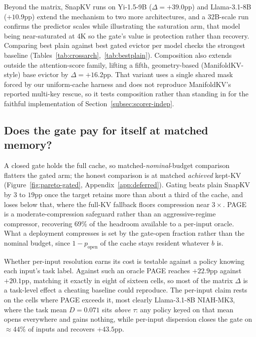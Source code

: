 \documentclass{article}
\newcommand{\method}{PAGE\xspace}
\begin{document}
Beyond the matrix, SnapKV runs on Yi-1.5-9B ($\Delta = +39.0$pp) and
Llama-3.1-8B ($+10.9$pp) extend the mechanism to two more architectures, and a
32B-scale run confirms the predictor scales while illustrating the saturation
arm, that model being near-saturated at 4K so the gate's value is protection
rather than recovery. Comparing best plain against best gated evictor per
model checks the strongest baseline
(Tables~\ref{tab:crossarch},~\ref{tab:bestplain}). Composition also extends
outside the attention-score family, lifting a fifth, geometry-based
(ManifoldKV-style) base evictor by $\Delta = +16.2$pp. That variant uses a
single shared mask forced by our uniform-cache harness and does not reproduce
ManifoldKV's reported multi-key rescue, so it tests composition rather than
standing in for the faithful implementation of
Section~\ref{subsec:scorer-indep}.

\subsection{Does the gate pay for itself at matched memory?}
\label{subsec:pareto}

A closed gate holds the full cache, so matched-\emph{nominal}-budget
comparison flatters the gated arm; the honest comparison is at matched
\emph{achieved} kept-KV (Figure~\ref{fig:pareto-gated},
Appendix~\ref{app:deferred}). Gating beats plain SnapKV by $3$ to $19$pp once
the target retains more than about a third of the cache, and loses below that,
where the full-KV fallback floors compression near $3\times$. \method is a moderate-compression safeguard rather than an aggressive-regime
compressor, recovering $69\%$ of the headroom available to a per-input oracle.
What a deployment compresses is set by the gate-open fraction rather than the
nominal budget, since $1 - p_{\text{open}}$ of the cache stays resident
whatever $b$ is.

Whether per-input resolution earns its cost is testable against a policy
knowing each input's task label. Against such an oracle \method reaches
$+22.9$pp against $+20.1$pp, matching it exactly in eight of sixteen cells, so
most of the matrix $\Delta$ is a task-level effect a cheating baseline could
reproduce. The per-input claim rests on the cells where \method exceeds it,
most clearly Llama-3.1-8B NIAH-MK3, where the task mean $D = 0.071$ sits
\emph{above} $\tau$: any policy keyed on that mean opens everywhere and gains
nothing, while per-input dispersion closes the gate on $\approx 44\%$ of
inputs and recovers $+43.5$pp.
\end{document}
